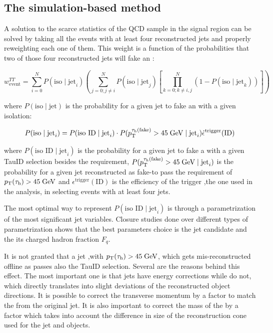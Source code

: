 \subsection{The simulation-based method}
\label{dihad:subsec:eventweight}

A solution to the scarce statistics of the QCD sample in the signal region can be solved by taking all the events with at least four reconstructed jets and properly reweighting each one of them. This weight is a function of the probabilities that two of those four reconstructed jets will fake an \hadtau:

\begin{equation}
w^{TT}_{\text{event}} = \sum_{i=0}^{N}P(\text{iso}\mid \text{jet}_{i})\left(\sum_{j=0; j\neq i}^{N}P(\text{iso}\mid \text{jet}_{j})\left[\prod_{k=0; k\neq i,j}^{N}(1-P(\text{iso}\mid \text{jet}_{k}))\right]\right)
\end{equation}

where $P(\text{iso}\mid \text{jet})$ is the probability for a given jet to fake an \hadtau with a given isolation:

\begin{equation}
P(\text{iso}\mid \text{jet}_{i}) = P(\text{iso ID}\mid \text{jet}_{i}) \cdot P(p_{\text{T}}^{\tau_{\text{h}}(\text{fake})} > 45\;\text{Ge}\kern-0.06667em\text{V}\mid \text{jet}_{i}) \dot \epsilon^{\text{trigger}}(\text{ID})
\end{equation}

where $P(\text{iso ID}\mid \text{jet}_{i})$ is the probability for a given jet to fake a \hadtau with a given TauID selection besides the \pt requirement, $P(p_{\text{T}}^{\tau_{\text{h}}(\text{fake})} > 45\;\text{Ge}\kern-0.06667em\text{V}\mid \text{jet}_{i})$ is the probability for a given jet reconstructed as fake-\hadtau to pass the requirement of $p_{\text{T}}(\tau_{\text{h}})> 45\;\text{Ge}\kern-0.06667em\text{V}$ and $\epsilon^{\text{trigger}}(\text{ID})$ is the efficiency of the trigger ,the one used in the analysis, in selecting events with at least four jets.

The most optimal way to represent $P(\text{iso ID}\mid \text{jet}_{i})$ is through a parametrization of the most significant jet variables. Closure studies done over different types of parametrization shows that the best parameters choice is the jet candidate \pt and the its charged hadron fraction $F_{q}$.

It is not granted that a jet ,with $p_{\text{T}}(\tau_{\text{h}})> 45\;\text{Ge}\kern-0.06667em\text{V}$, which gets mis-reconstructed offline as \hadtau passes also the TauID \pt selection. Several are the reasons behind this effect. The most important one is that jets have energy corrections while \hadtaufake do not, which directly translates into slight deviations of the reconstructed object directions. It is possible to correct the \hadtau transverse momentum by a factor to match the \pt from the original jet. It is also important to correct the mass of the \hadtaufake by a factor which takes into account the difference in size of the reconstruction cone used for the jet and \hadtau objects.

